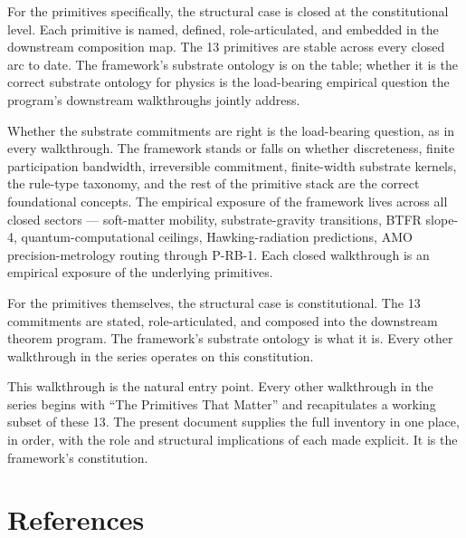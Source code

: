 \documentclass[11pt,a4paper]{article}
\begin{document}
For the primitives specifically, the structural case is closed at the constitutional level. Each primitive is named, defined, role-articulated, and embedded in the downstream composition map. The 13 primitives are stable across every closed arc to date. The framework's substrate ontology is on the table; whether it is the correct substrate ontology for physics is the load-bearing empirical question the program's downstream walkthroughs jointly address.

Whether the substrate commitments are right is the load-bearing question, as in every walkthrough. The framework stands or falls on whether discreteness, finite participation bandwidth, irreversible commitment, finite-width substrate kernels, the rule-type taxonomy, and the rest of the primitive stack are the correct foundational concepts. The empirical exposure of the framework lives across all closed sectors --- soft-matter mobility, substrate-gravity transitions, BTFR slope-4, quantum-computational ceilings, Hawking-radiation predictions, AMO precision-metrology routing through P-RB-1. Each closed walkthrough is an empirical exposure of the underlying primitives.

For the primitives themselves, the structural case is constitutional. The 13 commitments are stated, role-articulated, and composed into the downstream theorem program. The framework's substrate ontology is what it is. Every other walkthrough in the series operates on this constitution.

This walkthrough is the natural entry point. Every other walkthrough in the series begins with ``The Primitives That Matter'' and recapitulates a working subset of these 13. The present document supplies the full inventory in one place, in order, with the role and structural implications of each made explicit. It is the framework's constitution.

\section{References}
\end{document}
